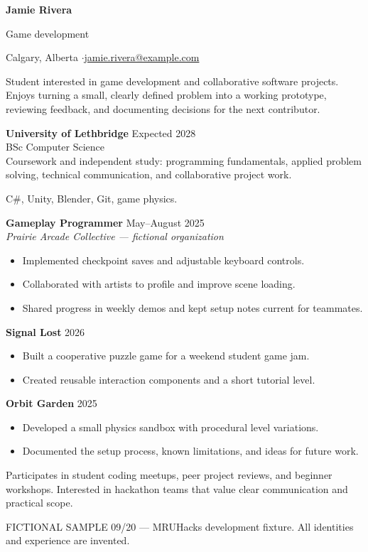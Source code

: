 
{\Huge\bfseries Jamie Rivera}\par
{\large\color{accent} Game development}\par
Calgary, Alberta \enspace$\cdot$\enspace \href{mailto:jamie.rivera@example.com}{jamie.rivera@example.com}

Student interested in game development and collaborative software projects.
Enjoys turning a small, clearly defined problem into a working prototype,
reviewing feedback, and documenting decisions for the next contributor.

\textbf{University of Lethbridge} \hfill Expected 2028\\
BSc Computer Science\\
Coursework and independent study: programming fundamentals, applied problem solving,
technical communication, and collaborative project work.

C\#, Unity, Blender, Git, game physics.

\textbf{Gameplay Programmer} \hfill May--August 2025\\
\textit{Prairie Arcade Collective --- fictional organization}
\begin{itemize}
\item Implemented checkpoint saves and adjustable keyboard controls.
\item Collaborated with artists to profile and improve scene loading.
\item Shared progress in weekly demos and kept setup notes current for teammates.
\end{itemize}

\textbf{Signal Lost} \hfill 2026
\begin{itemize}
\item Built a cooperative puzzle game for a weekend student game jam.
\item Created reusable interaction components and a short tutorial level.
\end{itemize}
\textbf{Orbit Garden} \hfill 2025
\begin{itemize}
\item Developed a small physics sandbox with procedural level variations.
\item Documented the setup process, known limitations, and ideas for future work.
\end{itemize}

Participates in student coding meetups, peer project reviews, and beginner workshops.
Interested in hackathon teams that value clear communication and practical scope.

\vfill
{\footnotesize\color{gray} FICTIONAL SAMPLE 09/20 --- MRUHacks development fixture.
All identities and experience are invented.}

